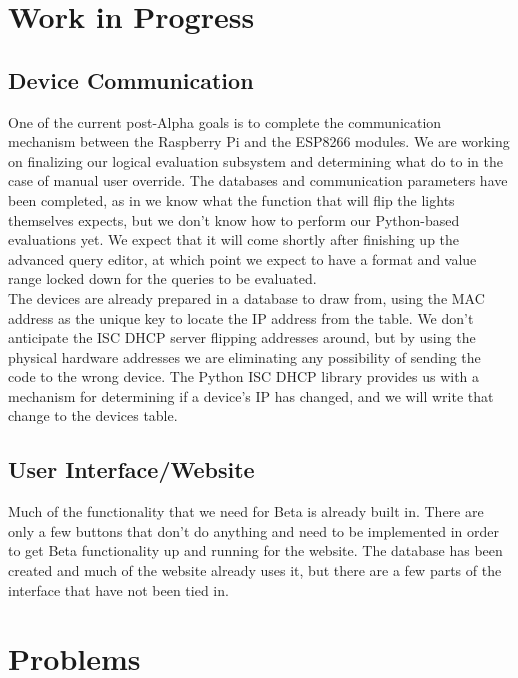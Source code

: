\documentclass[oneside,openright]{book}
\begin{document}
\section{Work in Progress}
\subsection{Device Communication}
One of the current post-Alpha goals is to complete the communication mechanism between the Raspberry Pi and the ESP8266 modules. We are working on finalizing our logical evaluation subsystem and determining what do to in the case of manual user override. The databases and communication parameters have been completed, as in we know what the function that will flip the lights themselves expects, but we don't know how to perform our Python-based evaluations yet. We expect that it will come shortly after finishing up the advanced query editor, at which point we expect to have a format and value range locked down for the queries to be evaluated.\\

The devices are already prepared in a database to draw from, using the MAC address as the unique key to locate the IP address from the table. We don't anticipate the ISC DHCP server flipping addresses around, but by using the physical hardware addresses we are eliminating any possibility of sending the code to the wrong device. The Python ISC DHCP library provides us with a mechanism for determining if a device's IP has changed, and we will write that change to the devices table.

\subsection{User Interface/Website}
Much of the functionality that we need for Beta is already built in. There are only a few buttons that don't do anything and need to be implemented in order to get Beta functionality up and running for the website. The database has been created and much of the website already uses it, but there are a few parts of the interface that have not been tied in. 

\section{Problems}
\end{document}
